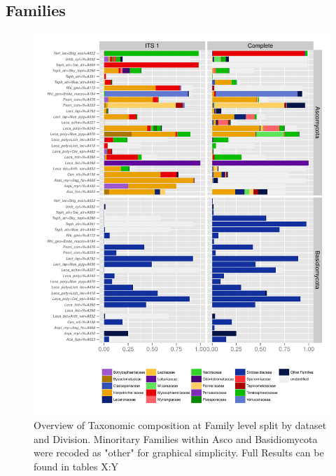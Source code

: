 \documentclass[a4paper, 11]{article}\usepackage[]{graphicx}\usepackage[]{color}
\makeatletter
\def\maxwidth{ %
  \ifdim\Gin@nat@width>\linewidth
    \linewidth
  \else
    \Gin@nat@width
  \fi
}
\newenvironment{knitrout}{}{} %
\makeatother
\begin{document}
\subsection{Families}
%
%
\begin{knitrout}
\color{fgcolor}\begin{figure}[H]
\includegraphics[width=\maxwidth]{figure/14_PlotFamilies-1} \caption[Overview of Taxonomic composition at Family level split by dataset and Division]{Overview of Taxonomic composition at Family level split by dataset and Division. Minoritary Families within Asco and Basidiomycota were recoded as "other" for graphical simplicity. Full Results can be found in tables X:Y}\label{fig:14_PlotFamilies}
\end{figure}


\end{knitrout}
\newpage
%
\end{document}
